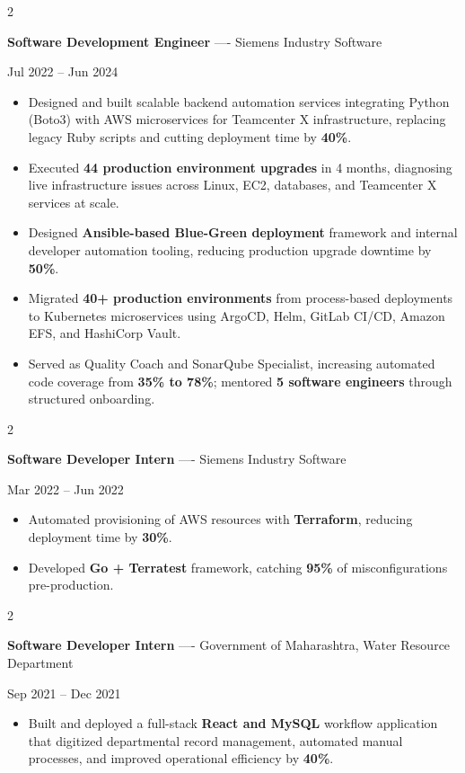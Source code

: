 \documentclass[10pt, letterpaper]{article}
\newenvironment{highlights}{
    \begin{itemize}[
        topsep=0.10 cm,
        parsep=0.06 cm,
        partopsep=0pt,
        itemsep=0.06 cm,
        leftmargin=12pt
    ]
}{
    \end{itemize}
}
\newenvironment{twocolentry}[2][]{
    \onecolentry
    \def\secondColumn{#2}
    \setcolumnwidth{\fill, 4.5 cm}
    \begin{paracol}{2}
}{
    \switchcolumn \raggedleft \secondColumn
    \end{paracol}
    \endonecolentry
}
\begin{document}
\vspace{0.15 cm}

\begin{twocolentry}{Jul 2022 -- Jun 2024}
\textbf{Software Development Engineer} ---- Siemens Industry Software
\end{twocolentry}
\begin{highlights}
  \item Designed and built scalable backend automation services integrating Python (Boto3) with AWS microservices for Teamcenter X infrastructure, replacing legacy Ruby scripts and cutting deployment time by \textbf{40\%}.
  \item Executed \textbf{44 production environment upgrades} in 4 months, diagnosing live infrastructure issues across Linux, EC2, databases, and Teamcenter X services at scale.
  \item Designed \textbf{Ansible-based Blue-Green deployment} framework and internal developer automation tooling, reducing production upgrade downtime by \textbf{50\%}.
  \item Migrated \textbf{40+ production environments} from process-based deployments to Kubernetes microservices using ArgoCD, Helm, GitLab CI/CD, Amazon EFS, and HashiCorp Vault.
  \item Served as Quality Coach and SonarQube Specialist, increasing automated code coverage from \textbf{35\% to 78\%}; mentored \textbf{5 software engineers} through structured onboarding.
\end{highlights}

\vspace{0.15 cm}

\begin{twocolentry}{Mar 2022 -- Jun 2022}
\textbf{Software Developer Intern} ---- Siemens Industry Software
\end{twocolentry}
\begin{highlights}
  \item Automated provisioning of AWS resources with \textbf{Terraform}, reducing deployment time by \textbf{30\%}.
  \item Developed \textbf{Go + Terratest} framework, catching \textbf{95\%} of misconfigurations pre-production.
\end{highlights}

\vspace{0.15 cm}

\begin{twocolentry}{Sep 2021 -- Dec 2021}
\textbf{Software Developer Intern} ---- Government of Maharashtra, Water Resource Department
\end{twocolentry}
\begin{highlights}
  \item Built and deployed a full-stack \textbf{React and MySQL} workflow application that digitized departmental record management, automated manual processes, and improved operational efficiency by \textbf{40\%}.
\end{highlights}
\end{document}
